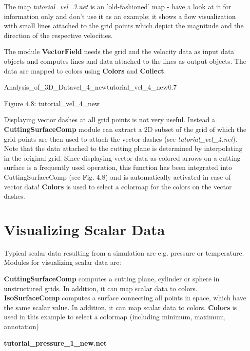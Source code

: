 The map {\it tutorial\_vel\_3.net} is an 'old-fashioned' map - have a look at it for information only
and don't use it as an example; it shows a flow visualization with small lines attached to 
the grid points which depict the magnitude and the direction of the respective 
velocities. 

The module {\bf VectorField} needs the grid and the velocity data as input data objects 
and computes lines and data attached to the lines as output objects. The data 
are mapped to colors using {\bf Colors} and {\bf Collect}. 

\begin{covimg}{Analysis_of_3D_Data}{vel_4_new}{tutorial\_vel\_4\_new}{0.7}\end{covimg}
\begin{htmlonly}
Figure 4.8: tutorial_vel_4_new
\vspace{0.5cm}
\end{htmlonly}

Displaying vector dashes at all grid points is not very useful. Instead a 
{\bf CuttingSurfaceComp} module can extract a 2D subset of the grid of which the grid 
points are then used to attach the vector dashes (see {\it tutorial\_vel\_4.net}). Note 
that the data attached to the cutting plane is determined by interpolating in the 
original grid. Since displaying vector data as colored arrows on a cutting surface is a frequently
used operation, this function has been integrated into CuttingSurfaceComp (see Fig. 4.8) and
is automatically activated in case of vector data!
{\bf Colors} is used to select a colormap for the colors on the vector dashes.   


\clearpage
\section{Visualizing Scalar Data}


Typical scalar data resulting from a simulation are e.g. pressure or temperature. Modules for visualizing scalar data
are:

{\bf CuttingSurfaceComp} computes a cutting plane, cylinder or sphere in unstructured grids.
In addition, it can map scalar data to colors.
{\bf IsoSurfaceComp} computes a surface connecting all points in space, which have the 
same scalar value. In addition, it can map scalar data to colors.
{\bf Colors} is used in this example to select a colormap (including minimum, maximum,
annotation) 

\vspace{1cm}
\begin{Large}{\bf tutorial\_pressure\_1\_new.net}\end{Large}
\vspace{0.5cm}

